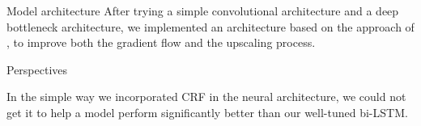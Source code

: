 \documentclass[final]{beamer}
\newlength{\onecolwid}
\begin{document}
\begin{frame}[t]
\begin{columns}[t]
\begin{column}{\onecolwid}
\begin{block}{Model architecture}
After trying a simple convolutional architecture and a deep bottleneck architecture, we implemented an architecture based on the approach of \cite{ronneberger2015unet}, to improve both the gradient flow and the upscaling process. 

\end{block}






\begin{block}{Perspectives}

In the simple way we incorporated CRF in the neural architecture, we could not get it to help a model perform significantly better than our well-tuned bi-LSTM.



\end{block}






\end{column}
\end{columns}
\end{frame}
\end{document}
